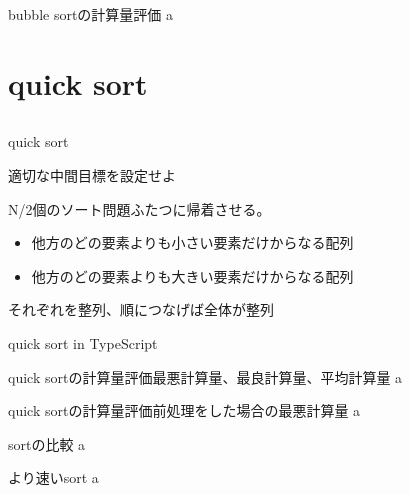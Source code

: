 \documentclass{beamer}
\begin{document}
\begin{frame}[fragile]{bubble sortの計算量評価}{}
a
\end{frame}

\section{quick sort}		%
\subsection{}

\begin{frame}[fragile]{quick sort}{}

\vfill
適切な中間目標を設定せよ

\pause
\vfill
N/2個のソート問題ふたつに帰着させる。

\begin{itemize}%
\item 他方のどの要素よりも小さい要素だけからなる配列
\item 他方のどの要素よりも大きい要素だけからなる配列
\end{itemize}
それぞれを整列、順につなげば全体が整列
\end{frame}

\begin{frame}[fragile]{quick sort in TypeScript}{}
\end{frame}

\begin{frame}[fragile]{quick sortの計算量評価}{最悪計算量、最良計算量、平均計算量}
a
\end{frame}

\begin{frame}[fragile]{quick sortの計算量評価}{前処理をした場合の最悪計算量}
a
\end{frame}

\begin{frame}[fragile]{sortの比較}{}
a
\end{frame}

\begin{frame}[fragile]{より速いsort}{}
a
\end{frame}
\end{document}
